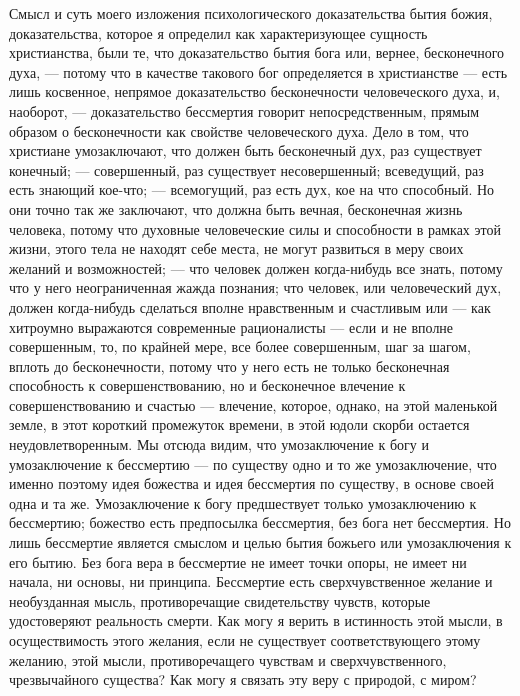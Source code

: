 \documentclass[12pt]{article}
\begin{document}
Смысл и суть моего изложения психологического доказательства бытия божия, доказательства, которое я определил как характеризующее сущность христианства, были те, что доказательство бытия бога или, вернее, бесконечного духа, --- потому что в качестве такового бог определяется в христианстве --- есть лишь косвенное, непрямое доказательство бесконечности человеческого духа, и, наоборот, --- доказательство бессмертия говорит непосредственным, прямым образом о бесконечности как свойстве человеческого духа. Дело в том, что христиане умозаключают, что должен быть бесконечный дух, раз существует конечный; --- совершенный, раз существует несовершенный; всеведущий, раз есть знающий кое-что; --- всемогущий, раз есть дух, кое на что способный. Но они точно так же заключают, что должна быть вечная, бесконечная жизнь человека, потому что духовные человеческие силы и способности в рамках этой жизни, этого тела не находят себе места, не могут развиться в меру своих желаний и возможностей; --- что человек должен когда-нибудь все знать, потому что у него неограниченная жажда познания; что человек, или человеческий дух, должен когда-нибудь сделаться вполне нравственным и счастливым или --- как хитроумно выражаются современные рационалисты --- если и не вполне совершенным, то, по крайней мере, все более совершенным, шаг за шагом, вплоть до бесконечности, потому что у него есть не только бесконечная способность к совершенствованию, но и бесконечное влечение к совершенствованию и счастью --- влечение, которое, однако, на этой маленькой земле, в этот короткий промежуток времени, в этой юдоли скорби остается неудовлетворенным. Мы отсюда видим, что умозаключение к богу и умозаключение к бессмертию --- по существу одно и то же умозаключение, что именно поэтому идея божества и идея бессмертия по существу, в основе своей одна и та же. Умозаключение к богу предшествует только умозаключению к бессмертию; божество есть предпосылка бессмертия, без бога нет бессмертия. Но лишь бессмертие является смыслом и целью бытия божьего или умозаключения к его бытию. Без бога вера в бессмертие не имеет точки опоры, не имеет ни начала, ни основы, ни принципа. Бессмертие есть сверхчувственное желание и необузданная мысль, противоречащие свидетельству чувств, которые удостоверяют реальность смерти. Как могу я верить в истинность этой мысли, в осуществимость этого желания, если не существует соответствующего этому желанию, этой мысли, противоречащего чувствам и сверхчувственного, чрезвычайного существа? Как могу я связать эту веру с природой, с миром? 
\end{document}
